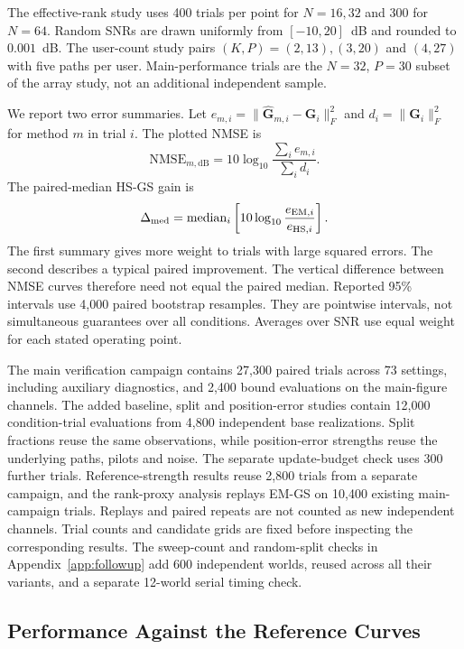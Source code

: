 \documentclass[journal]{IEEEtran}
\begin{document}
The effective-rank study uses 400 trials per point for $N=16,32$ and
300 for $N=64$. Random SNRs are drawn uniformly from $[-10,20]$~dB and
rounded to $0.001$~dB. The user-count study pairs $(K,P)=(2,13),(3,20)$
and $(4,27)$ with five paths per user. Main-performance trials are the
$N=32$, $P=30$ subset of the array study, not an additional independent
sample.

We report two error summaries. Let
$e_{m,i}=\|\widehat{\mathbf G}_{m,i}-\mathbf G_i\|_F^2$ and
$d_i=\|\mathbf G_i\|_F^2$ for method $m$ in trial $i$. The plotted NMSE is
\begin{equation}
\mathrm{NMSE}_{m,\mathrm{dB}}
=10\log_{10}\frac{\sum_i e_{m,i}}{\sum_i d_i}.
\label{eq:nmse-summary}
\end{equation}
The paired-median HS-GS gain is
\begin{equation}
\Delta_{\rm med}=\operatorname{median}_i
 \left[10\log_{10}\frac{e_{{\rm EM},i}}{e_{{\rm HS},i}}\right].
\end{equation}
The first summary gives more weight to trials with large squared errors.
The second describes a typical paired improvement. The vertical difference
between NMSE curves therefore need not equal the paired median. Reported
95\% intervals use 4,000 paired bootstrap resamples. They are pointwise
intervals, not simultaneous guarantees over all conditions. Averages over
SNR use equal weight for each stated operating point.

The main verification campaign contains 27,300 paired trials across
73 settings, including auxiliary diagnostics, and 2,400 bound evaluations
on the main-figure channels. The added baseline, split and position-error
studies contain 12,000 condition-trial evaluations from 4,800 independent
base realizations. Split fractions reuse the same observations, while
position-error strengths reuse the underlying paths, pilots and noise.
The separate update-budget check uses 300 further trials. Reference-strength
results reuse 2,800 trials from a separate campaign, and the rank-proxy
analysis replays EM-GS on 10,400 existing main-campaign trials. Replays and
paired repeats are not counted as new independent channels. Trial counts
and candidate grids are fixed before inspecting the corresponding results. The sweep-count and random-split checks in
Appendix~\ref{app:followup} add 600 independent worlds, reused across
all their variants, and a separate 12-world serial timing check.

\subsection{Performance Against the Reference Curves}
\label{sec:main}
\end{document}

